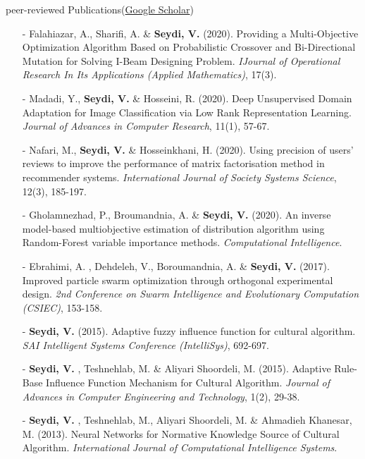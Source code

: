 \documentclass{resume} %
\begin{document}
\begin{rSection}{peer-reviewed Publications\small{(\href{https://scholar.google.com/citations?hl=en&user=L2z7NuwAAAAJ&view_op=list_works}{Google Scholar})}}
\begin{itemize}
\item[-] Falahiazar, A., Sharifi, A. \faEnvelopeO \hspace{1ex}  \& \textbf{Seydi, V.} (2020). Providing a Multi-Objective Optimization Algorithm Based on Probabilistic Crossover and Bi-Directional Mutation for Solving I-Beam Designing Problem. \textit{IJournal of Operational Research In Its Applications (Applied Mathematics)}, 17(3).
\item[-] Madadi, Y., \textbf{Seydi, V.} \faEnvelopeO \hspace{1ex}  \& Hosseini, R. (2020). Deep Unsupervised Domain Adaptation for Image Classification via Low Rank Representation Learning. \textit{Journal of Advances in Computer Research}, 11(1), 57-67.
\item[-] Nafari, M., \textbf{Seydi, V.} \faEnvelopeO \hspace{1ex}  \& Hosseinkhani, H. (2020). Using precision of users' reviews to improve the performance of matrix factorisation method in recommender systems. \textit{International Journal of Society Systems Science}, 12(3), 185-197.
\item[-] Gholamnezhad, P., Broumandnia, A. \faEnvelopeO \hspace{1ex}  \& \textbf{Seydi, V.} (2020). An inverse model-based multiobjective estimation of distribution algorithm using Random-Forest variable importance methods. \textit{Computational Intelligence}.
\item[-] Ebrahimi, A. \faEnvelopeO \hspace{1ex} , Dehdeleh, V., Boroumandnia, A. \& \textbf{Seydi, V.} (2017). Improved particle swarm optimization through orthogonal experimental design. \textit{2nd Conference on Swarm Intelligence and Evolutionary Computation (CSIEC)}, 153-158.
\item[-] \textbf{Seydi, V.} \faEnvelopeO \hspace{1ex}  (2015). Adaptive fuzzy influence function for cultural algorithm. \textit{SAI Intelligent Systems Conference (IntelliSys)}, 692-697.
\item[-] \textbf{Seydi, V.} \faEnvelopeO \hspace{1ex} , Teshnehlab, M. \& Aliyari Shoordeli, M. (2015). Adaptive Rule-Base Influence Function Mechanism for Cultural Algorithm. \textit{Journal of Advances in Computer Engineering and Technology}, 1(2), 29-38.
\item[-] \textbf{Seydi, V.} \faEnvelopeO \hspace{1ex} , Teshnehlab, M., Aliyari Shoordeli, M. \& Ahmadieh Khanesar, M. (2013). Neural Networks for Normative Knowledge Source of Cultural Algorithm. \textit{International Journal of Computational Intelligence Systems}.

\end{itemize}
\end{rSection}
\end{document}
